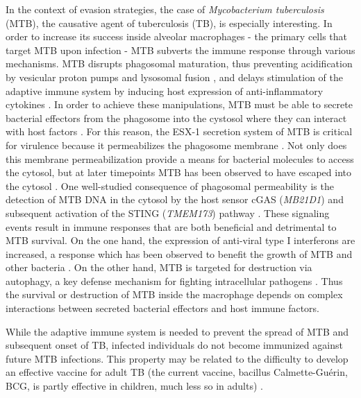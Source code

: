 In the context of evasion strategies, the case of \emph{Mycobacterium
  tuberculosis} (MTB), the causative agent of tuberculosis (TB), is
especially interesting. In order to increase its success inside
alveolar macrophages - the primary cells that target MTB upon
infection - MTB subverts the immune response through various
mechanisms. MTB disrupts phagosomal maturation, thus preventing
acidification by vesicular proton pumps and lysosomal fusion
\citep{Sturgill-Koszycki1994, Hornef2002, Hestvik2005}, and delays
stimulation of the adaptive immune system by inducing host expression
of anti-inflammatory cytokines \citep{VanHeyningen1997,
  Giacomini2001}. In order to achieve these manipulations, MTB must be
able to secrete bacterial effectors from the phagosome into the
cystosol where they can interact with host factors
\citep{Stanley2013}. For this reason, the ESX-1 secretion system of
MTB is critical for virulence because it permeabilizes the phagosome
membrane \citep{VanderWel2007, Simeone2015}. Not only does this
membrane permeabilization provide a means for bacterial molecules to
access the cytosol, but at later timepoints MTB has been observed to
have escaped into the cytosol \citep{Stanley2013}. One well-studied
consequence of phagosomal permeability is the detection of MTB DNA in
the cytosol by the host sensor cGAS (\emph{MB21D1}) and subsequent
activation of the STING (\emph{TMEM173}) pathway \citep{Dey2015,
  Collins2015, Watson2015, Wassermann2015}. These signaling events
result in immune responses that are both beneficial and detrimental to
MTB survival. On the one hand, the expression of anti-viral type I
interferons are increased, a response which has been observed to
benefit the growth of MTB and other bacteria \citep{Stanley2007}. On
the other hand, MTB is targeted for destruction via autophagy, a key
defense mechanism for fighting intracellular pathogens
\citep{Watson2012}. Thus the survival or destruction of MTB inside the
macrophage depends on complex interactions between secreted bacterial
effectors and host immune factors.

While the adaptive immune system is needed to prevent the spread of
MTB and subsequent onset of TB, infected individuals do not become
immunized against future MTB infections. This property may be related
to the difficulty to develop an effective vaccine for adult TB (the
current vaccine, bacillus Calmette-Gu\'{e}rin, BCG, is partly
effective in children, much less so in adults) \citep{Wang2013}.

